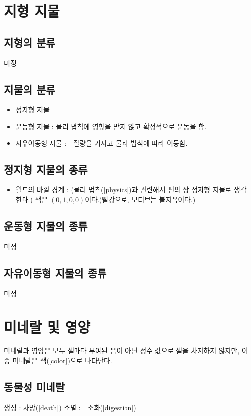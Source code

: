 \documentclass[a4paper,12pt]{article}
\begin{document}
\section{지형 지물}\label{geography and stuff}
\subsection{지형의 분류}\label{geography classification} 
미정
\subsection{지물의 분류}\label{stuff classification}
\begin{itemize} 
\item 정지형 지물
\item 운동형 지물 : 물리 법칙에 영향을 받지 않고 확정적으로 운동을 함.
\item 자유이동형 지물 :　질량을 가지고 물리 법칙에 따라 이동함.
\end{itemize} 
\subsection{정지형 지물의 종류}\label{immobile stuffs}
\begin{itemize} 
\item 월드의 바깥 경계 : (물리 법칙(\ref{physics})과 관련해서 편의 상 정지형 지물로 생각한다.) 색은 $(0,1,0,0)$이다.(빨강으로, 모티브는 불지옥이다.)
\end{itemize}
\subsection{운동형 지물의 종류}\label{mobile stuffs}
미정
\subsection{자유이동형 지물의 종류} \label{free-moving stuffs}
미정

\section{미네랄 및 영양}\label{mineral and nutrition}
미네랄과 영양은 모두 셀마다 부여된 음이 아닌 정수 값으로 셀을 차지하지 않지만, 이 중 미네랄은 색(\ref{color})으로 나타난다. 
\subsection{동물성 미네랄}\label{animal mineral detail}
생성 : 사망(\ref{death})
소멸 :　소화(\ref{digestion}) 
\end{document}
